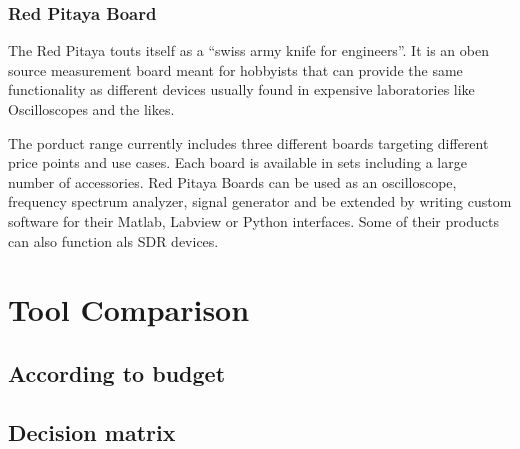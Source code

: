 \subsubsection{Red Pitaya Board}
The Red Pitaya touts itself as a ``swiss army knife for engineers''. It is an oben source measurement board meant for hobbyists that can provide the same functionality as different devices usually found in expensive laboratories like Oscilloscopes and the likes.

The porduct range currently includes three different boards targeting different price points and use cases. Each board is available in sets including a large number of accessories. Red Pitaya Boards can be used as an oscilloscope, frequency spectrum analyzer, signal generator and be extended by writing custom software for their Matlab, Labview or Python interfaces. Some of their products can also function als SDR devices.

\section{Tool Comparison}
\subsection{According to budget}
\subsection{Decision matrix}